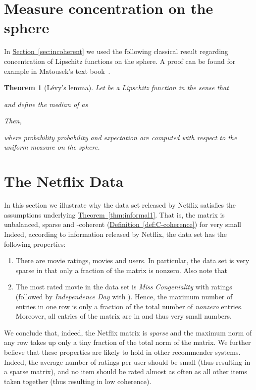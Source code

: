 \documentclass[letterpaper,11pt]{article}
\newtheorem{theorem}{Theorem}[section]
\theoremstyle{definition}
\newcommand{\definitionref}[1]{\hyperref[def:#1]{Definition~\ref{def:#1}}}
\newcommand{\sectionlabel}[1]{\label{sec:#1}}
\newcommand{\sectionref}[1]{\hyperref[sec:#1]{Section~\ref{sec:#1}}}
\newcommand{\theoremlabel}[1]{\label{thm:#1}}
\newcommand{\theoremref}[1]{\hyperref[thm:#1]{Theorem~\ref{thm:#1}}}
\begin{document}
\section{Measure concentration on the sphere}
In \sectionref{incoherent} we used the following classical result regarding
concentration of Lipschitz functions on the sphere. A proof can be found for
example in Matousek's text book~\cite{Matousek02}.
\begin{theorem}[L\'{e}vy's lemma]\theoremlabel{levy}
Let  be a Lipschitz function in the sense that

and define the median of  as

Then,

where probability probability and expectation are computed with respect to the
uniform measure on the sphere.
\end{theorem}

\section{The Netflix Data}
\sectionlabel{netflix}
In this section we illustrate why the data set released by Netflix satisfies the
assumptions underlying \theoremref{informal1}. That is, the matrix is
unbalanced, sparse and -coherent (\definitionref{C-coherence}) for very
small  Indeed, according to information released by Netflix, the data set
has the following properties:
\begin{enumerate}
\item There are  movie ratings,
 movies and  users. In particular, the data set is very sparse
in that only a  fraction of the matrix is nonzero. Also note
that 
\item The most rated movie in the data set is \emph{Miss Congeniality} with 
ratings (followed by \emph{Independence Day} with ). Hence, the maximum
number of entries in one row is only a  fraction of the
total number of \emph{nonzero} entries. 
Moreover, all entries of the matrix are in  and thus very small
numbers.
\end{enumerate}
We conclude that, indeed, the Netflix matrix is \emph{sparse} and the maximum
norm of any row takes up only a tiny fraction of the total norm of the matrix.
We further believe that these properties are likely to hold in other
recommender systems.  Indeed, the average number of ratings per user should be
small (thus resulting in a sparse matrix), and no item should be rated almost
as often as all other items taken together (thus resulting in low coherence).
\end{document}
